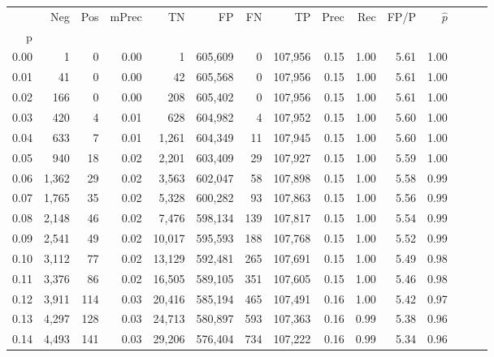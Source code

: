 \begin{tabular}{rrrrrrrrrrrrrrr}
\toprule
{} &     Neg &    Pos & mPrec &       TN &       FP &       FN &       TP &  Prec &   Rec &  FP/P & $\hat{p}$ \\
p    &         &        &       &          &          &          &          &       &       &       &           \\
\midrule
0.00 &       1 &      0 &  0.00 &        1 &  605,609 &        0 &  107,956 &  0.15 &  1.00 &  5.61 &      1.00 \\
0.01 &      41 &      0 &  0.00 &       42 &  605,568 &        0 &  107,956 &  0.15 &  1.00 &  5.61 &      1.00 \\
0.02 &     166 &      0 &  0.00 &      208 &  605,402 &        0 &  107,956 &  0.15 &  1.00 &  5.61 &      1.00 \\
0.03 &     420 &      4 &  0.01 &      628 &  604,982 &        4 &  107,952 &  0.15 &  1.00 &  5.60 &      1.00 \\
0.04 &     633 &      7 &  0.01 &    1,261 &  604,349 &       11 &  107,945 &  0.15 &  1.00 &  5.60 &      1.00 \\
0.05 &     940 &     18 &  0.02 &    2,201 &  603,409 &       29 &  107,927 &  0.15 &  1.00 &  5.59 &      1.00 \\
0.06 &   1,362 &     29 &  0.02 &    3,563 &  602,047 &       58 &  107,898 &  0.15 &  1.00 &  5.58 &      0.99 \\
0.07 &   1,765 &     35 &  0.02 &    5,328 &  600,282 &       93 &  107,863 &  0.15 &  1.00 &  5.56 &      0.99 \\
0.08 &   2,148 &     46 &  0.02 &    7,476 &  598,134 &      139 &  107,817 &  0.15 &  1.00 &  5.54 &      0.99 \\
0.09 &   2,541 &     49 &  0.02 &   10,017 &  595,593 &      188 &  107,768 &  0.15 &  1.00 &  5.52 &      0.99 \\
0.10 &   3,112 &     77 &  0.02 &   13,129 &  592,481 &      265 &  107,691 &  0.15 &  1.00 &  5.49 &      0.98 \\
0.11 &   3,376 &     86 &  0.02 &   16,505 &  589,105 &      351 &  107,605 &  0.15 &  1.00 &  5.46 &      0.98 \\
0.12 &   3,911 &    114 &  0.03 &   20,416 &  585,194 &      465 &  107,491 &  0.16 &  1.00 &  5.42 &      0.97 \\
0.13 &   4,297 &    128 &  0.03 &   24,713 &  580,897 &      593 &  107,363 &  0.16 &  0.99 &  5.38 &      0.96 \\
0.14 &   4,493 &    141 &  0.03 &   29,206 &  576,404 &      734 &  107,222 &  0.16 &  0.99 &  5.34 &      0.96 \\

\end{tabular}
